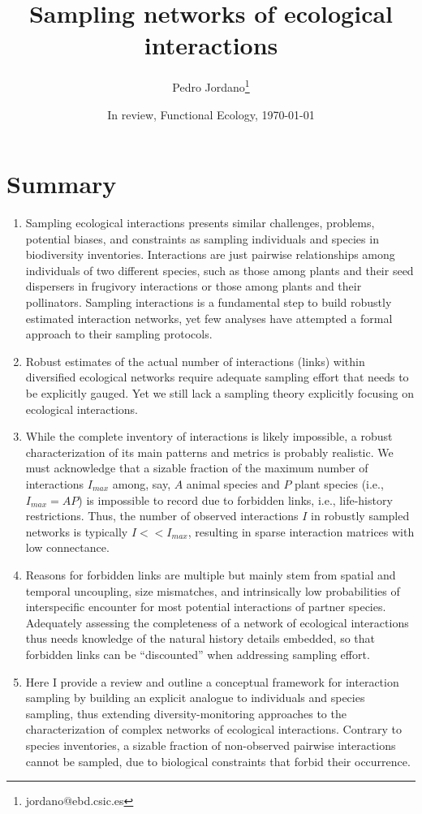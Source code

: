 \documentclass[12pt]{article}
\title{Sampling networks of ecological interactions}
\author[a]{Pedro Jordano\thanks{jordano@ebd.csic.es}}
\affil[a]{Integrative Ecology Group, Estaci\'on Biol\'ogica de Do\~nana, Consejo Superior de Investigaciones Cient\'ificas (EBD-CSIC), Avenida Americo Vespucio s\slash n, E--41092 Sevilla, Spain}
\date{In review, Functional Ecology, \today}
\begin{document}
\maketitle
\section*{Summary}
\begin{enumerate}
\item Sampling ecological interactions presents similar challenges, problems, potential biases, and constraints as sampling individuals and species in biodiversity inventories. Interactions are just pairwise relationships among individuals of two different species, such as those among plants and their seed dispersers in frugivory interactions or those among plants and their pollinators. Sampling interactions is a fundamental step to build robustly estimated interaction networks, yet few analyses have attempted a formal approach to their sampling protocols.

\item Robust estimates of the actual number of interactions (links) within diversified ecological networks require adequate sampling effort that needs to be explicitly gauged. Yet we still lack a sampling theory explicitly focusing on ecological interactions.

\item While the complete inventory of interactions is likely impossible, a robust characterization of its main patterns and metrics is probably realistic. We must acknowledge that a sizable fraction of the maximum number of interactions $I_{max}$ among, say, $A$ animal species and $P$ plant species (i.e., $I_{max}= AP$) is impossible to record due to forbidden links, i.e., life-history restrictions. Thus, the number of observed interactions $I$ in robustly sampled networks is typically $I<<I_{max}$, resulting in sparse interaction matrices with low connectance.

\item Reasons for forbidden links are multiple but mainly stem from spatial and temporal uncoupling, size mismatches, and intrinsically low probabilities of interspecific encounter for most potential interactions of partner species. Adequately assessing the completeness of a network of ecological interactions thus needs knowledge of the natural history details embedded, so that forbidden links can be ``discounted'' when addressing sampling effort.

\item Here I provide a review and outline a conceptual framework for interaction sampling by building an explicit analogue to individuals and species sampling, thus extending diversity-monitoring approaches to the characterization of complex networks of ecological interactions. Contrary to species inventories, a sizable fraction of non-observed pairwise interactions cannot be sampled, due to biological constraints that forbid their occurrence.  


\end{enumerate}
\end{document}
